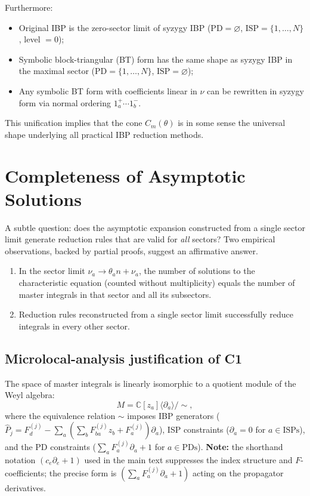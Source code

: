 \documentclass[12pt]{article}
\begin{document}
Furthermore:
\begin{itemize}
  \item Original IBP is the zero-sector limit of syzygy IBP
        ($\text{PD}=\varnothing$, $\text{ISP}=\{1,\ldots,N\}$, level $=0$);
  \item Symbolic block-triangular (BT) form has the same shape as syzygy IBP in
        the maximal sector ($\text{PD}=\{1,\ldots,N\}$, $\text{ISP}=\varnothing$);
  \item Any symbolic BT form with coefficients linear in $\nu$ can be rewritten in
        syzygy form via normal ordering $1_a^{+}\cdots1_b^{-}$.
\end{itemize}
This unification implies that the cone $C_m(\theta)$ is in some sense the
universal shape underlying all practical IBP reduction methods.

\section{Completeness of Asymptotic Solutions}\label{sec:completeness}

A subtle question: does the asymptotic expansion constructed from a single
sector limit generate reduction rules that are valid for \emph{all} sectors?
Two empirical observations, backed by partial proofs, suggest an affirmative
answer.

\begin{enumerate}
  \item[\textbf{C1}] In the sector limit $\nu_a\to\theta_an+\nu_a$, the number of
        solutions to the characteristic equation (counted without multiplicity)
        equals the number of master integrals in that sector and all its
        subsectors.

  \item[\textbf{C2}] Reduction rules reconstructed from a single sector limit
        successfully reduce integrals in every other sector.
\end{enumerate}

\subsection*{Microlocal-analysis justification of C1}

The space of master integrals is linearly isomorphic to a quotient module of the
Weyl algebra:
\[
  M = \mathbb C[z_a]\langle\partial_a\rangle\Big/\!\sim,
\tag{8.1}\label{eq:weyl_quotient}
\]
where the equivalence relation $\sim$ imposes IBP generators
($\hat P_j = F_d^{(j)}-\sum_a(\sum_bF_{ba}^{(j)}z_b+F_a^{(j)})\partial_a$),
ISP constraints ($\partial_a=0$ for $a\in\text{ISPs}$), and the
PD constraints ($\sum_aF_a^{(j)}\partial_a+1$ for $a\in\text{PDs}$).
\textbf{Note:} the shorthand notation $(c_e\partial_e+1)$ used in the main text
suppresses the index structure and $F$-coefficients; the precise form is
$(\sum_aF_a^{(j)}\partial_a+1)$ acting on the propagator derivatives.
\end{document}
